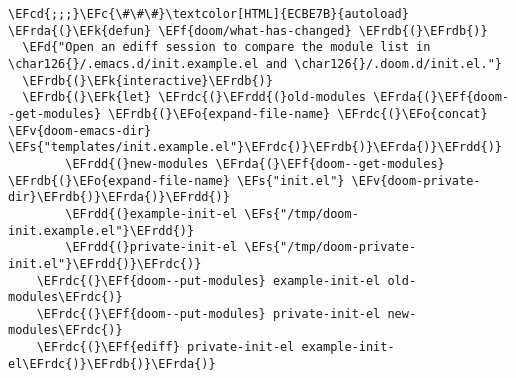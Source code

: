 \documentclass[a4wide,10pt]{article}
\newcommand{\EFc}[1]{\textcolor{EFc}{#1}} %
\newcommand{\EFcd}[1]{\textcolor{EFcd}{#1}} %
\newcommand{\EFs}[1]{\textcolor{EFs}{#1}} %
\newcommand{\EFd}[1]{\textcolor{EFd}{#1}} %
\newcommand{\EFk}[1]{\textcolor{EFk}{#1}} %
\newcommand{\EFf}[1]{\textcolor{EFf}{#1}} %
\newcommand{\EFv}[1]{\textcolor{EFv}{#1}} %
\newcommand{\EFo}[1]{\textcolor{EFo}{#1}} %
\newcommand{\EFrda}[1]{\textcolor{EFrda}{#1}} %
\newcommand{\EFrdb}[1]{\textcolor{EFrdb}{#1}} %
\newcommand{\EFrdc}[1]{\textcolor{EFrdc}{#1}} %
\newcommand{\EFrdd}[1]{\textcolor{EFrdd}{#1}} %
\begin{document}
\begin{Code}
\begin{Verbatim}
\EFcd{;;;}\EFc{\#\#\#}\textcolor[HTML]{ECBE7B}{autoload}
\EFrda{(}\EFk{defun} \EFf{doom/what-has-changed} \EFrdb{(}\EFrdb{)}
  \EFd{"Open an ediff session to compare the module list in
\char126{}/.emacs.d/init.example.el and \char126{}/.doom.d/init.el."}
  \EFrdb{(}\EFk{interactive}\EFrdb{)}
  \EFrdb{(}\EFk{let} \EFrdc{(}\EFrdd{(}old-modules \EFrda{(}\EFf{doom--get-modules} \EFrdb{(}\EFo{expand-file-name} \EFrdc{(}\EFo{concat} \EFv{doom-emacs-dir} \EFs{"templates/init.example.el"}\EFrdc{)}\EFrdb{)}\EFrda{)}\EFrdd{)}
        \EFrdd{(}new-modules \EFrda{(}\EFf{doom--get-modules} \EFrdb{(}\EFo{expand-file-name} \EFs{"init.el"} \EFv{doom-private-dir}\EFrdb{)}\EFrda{)}\EFrdd{)}
        \EFrdd{(}example-init-el \EFs{"/tmp/doom-init.example.el"}\EFrdd{)}
        \EFrdd{(}private-init-el \EFs{"/tmp/doom-private-init.el"}\EFrdd{)}\EFrdc{)}
    \EFrdc{(}\EFf{doom--put-modules} example-init-el old-modules\EFrdc{)}
    \EFrdc{(}\EFf{doom--put-modules} private-init-el new-modules\EFrdc{)}
    \EFrdc{(}\EFf{ediff} private-init-el example-init-el\EFrdc{)}\EFrdb{)}\EFrda{)}

\end{Verbatim}
\end{Code}
\end{document}
